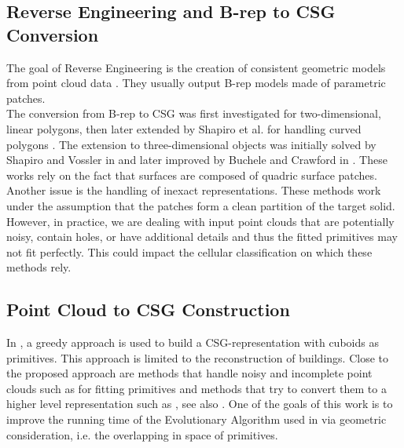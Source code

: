 \subsection{Reverse Engineering and B-rep to CSG Conversion}
The goal of Reverse Engineering is the creation of consistent geometric models from point cloud data \cite{VMC97,BMV01}. 
They usually output B-rep models made of parametric patches.
\\
The conversion from B-rep to CSG was first investigated 
for two-dimensional, linear polygons, then 
later extended by Shapiro et al. for handling curved polygons \cite{shapiro1991efficient, shapiro2001convex}. 
The extension to three-dimensional objects was initially solved 
by Shapiro and Vossler in 
\cite{shapiro1991construction, shapiro1993separation} 
and later improved by 
Buchele and Crawford in \cite{buchele2004three}. 
These works rely on the fact that surfaces are composed of quadric surface patches. 
Another issue is the handling of inexact representations. 
These methods work under the assumption that the patches form a clean partition of the 
target solid. However, in practice, we are dealing with input point clouds that are potentially 
noisy, contain holes, or have additional details and thus the fitted primitives may not fit perfectly. 
This could impact the cellular classification on which these methods rely. 

\subsection{Point Cloud to CSG Construction}
In \cite{xiao2014}, a greedy approach is used to build a \ac{CSG}-representation with cuboids as primitives. This approach is limited to the reconstruction of buildings. 
Close to the proposed approach are methods that handle noisy and incomplete point clouds 
such as \cite{schnabel2007efficient} for fitting primitives and methods that try to convert them to a higher level representation such as \cite{fayolle2016evolutionary}, see also \cite[Sections~7 and 8]{berger2017survey}. 
One of the goals of this work is to improve the running time of the Evolutionary Algorithm used in \cite{fayolle2016evolutionary} via geometric consideration, i.e. the overlapping in space of primitives.

